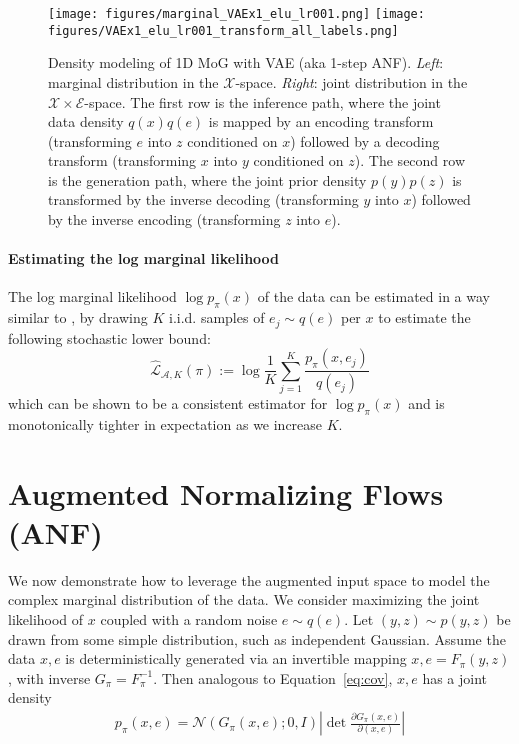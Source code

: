 \documentclass{article}
\def\gA{{\mathcal{A}}}
\def\gE{{\mathcal{E}}}
\def\gL{{\mathcal{L}}}
\def\gN{{\mathcal{N}}}
\def\gX{{\mathcal{X}}}
\begin{document}
\begin{figure*}[th]
    \centering
    \texttt{[image: figures/marginal\_VAEx1\_elu\_lr001.png]}
    \hspace{0.6cm}
    \texttt{[image: figures/VAEx1\_elu\_lr001\_transform\_all\_labels.png]}
    \vspace{-2mm}
    \caption{\small 
    Density modeling of 1D MoG with VAE (aka 1-step ANF). \emph{Left}: marginal distribution in the $\gX$-space. \emph{Right}: joint distribution in the $\gX\times\gE$-space. 
    The first row is the inference path, where the joint data density $q(x)q(e)$ is mapped by an encoding transform (transforming $e$ into $z$ conditioned on $x$) followed by a decoding transform (transforming $x$ into $y$ conditioned on $z$). 
    The second row is the generation path, where the joint prior density $p(y)p(z)$ is transformed by the inverse decoding (transforming $y$ into $x$) followed by the inverse encoding (transforming $z$ into $e$).}
    \label{fig:anf_1d_1}
\end{figure*}


\paragraph{Estimating the log marginal likelihood}
The log marginal likelihood $\log p_\pi(x)$ of the data can be estimated in a way similar to \citet{burda2015importance}, by drawing $K$ i.i.d. samples of $e_j\sim q(e)$ per $x$ to estimate the following stochastic lower bound:
$$\hat{\gL}_{\gA,K}(\pi)  
:= \log  \frac{1}{K}\sum_{j=1}^K \frac{p_\pi(x, e_j)}{q(e_j)}$$
which can be shown to be a consistent estimator for $\log p_\pi(x)$ and is monotonically tighter in expectation as we increase $K$. 


\section{Augmented Normalizing Flows (ANF)}
\label{sec:anf}

We now demonstrate how to leverage the augmented input space to model the complex marginal distribution of the data. 
We consider maximizing the joint likelihood of $x$ coupled with a random noise $e\sim q(e)$.
Let $(y, z) \sim p(y,z)$ be drawn from some simple distribution, such as independent Gaussian. 
Assume the data $x, e$ is deterministically generated via an invertible mapping $x,e = F_\pi(y,z)$, with inverse $G_\pi=F_\pi^{-1}$. 
Then analogous to Equation~\ref{eq:cov}, $x, e$ has a joint density 
\begin{align*}
p_\pi(x, e)=\gN(G_\pi(x, e); 0,I)\left|\det\frac{\partial G_\pi(x, e)}{\partial (x, e)}\right|
\end{align*}
\end{document}
